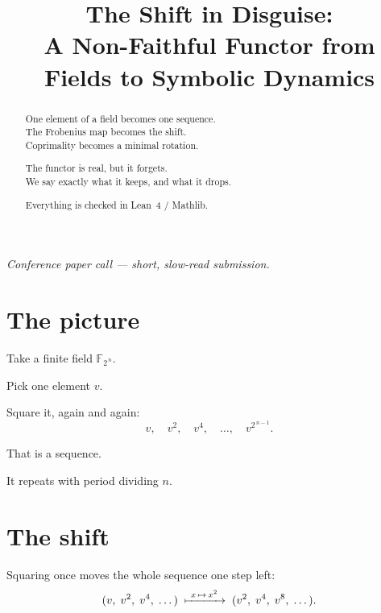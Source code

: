 \documentclass[11pt]{article}
\title{\textbf{The Shift in Disguise:\\[2pt]
A Non-Faithful Functor from Fields to Symbolic Dynamics}}
\author{}
\date{}
\begin{document}
\maketitle

\thispagestyle{empty}

\begin{abstract}
\noindent
One element of a field becomes one sequence.\\
The Frobenius map becomes the shift.\\
Coprimality becomes a minimal rotation.

\medskip
\noindent
The functor is real, but it forgets.\\
We say exactly what it keeps, and what it drops.

\medskip
\noindent
Everything is checked in Lean~4 / Mathlib.
\end{abstract}

\vfill

\noindent\textit{Conference paper call --- short, slow-read submission.}

\newpage


\section{The picture}

\bigskip

Take a finite field $\mathbb{F}_{2^{\,n}}$.

\bigskip

Pick one element $v$.

\bigskip

Square it, again and again:
\[
  v,\quad v^{2},\quad v^{4},\quad \dots,\quad v^{2^{\,n-1}}.
\]

\bigskip

That is a sequence.

\bigskip

It repeats with period dividing $n$.

\bigskip


\newpage


\section{The shift}

\bigskip

Squaring once moves the whole sequence one step left:
\[
  (v,\; v^{2},\; v^{4},\; \dots)
  \;\xmapsto{\ x\,\mapsto\, x^{2}\ }\;
  (v^{2},\; v^{4},\; v^{8},\; \dots).
\]
\end{document}
